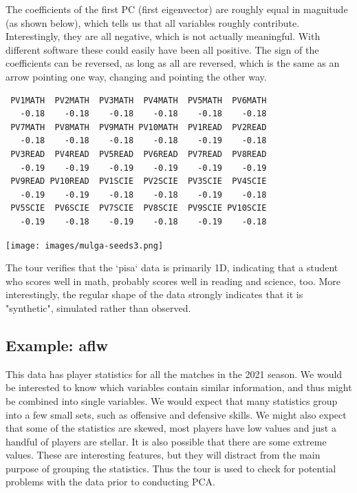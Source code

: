 \documentclass[
  letterpaper,
]{krantz}
\newenvironment{Shaded}{\begin{snugshade}}{\end{snugshade}}
\newcommand{\DecValTok}[1]{\textcolor[rgb]{0.68,0.00,0.00}{#1}}
\newcommand{\FunctionTok}[1]{\textcolor[rgb]{0.28,0.35,0.67}{#1}}
\newcommand{\NormalTok}[1]{\textcolor[rgb]{0.00,0.23,0.31}{#1}}
\newcommand{\SpecialCharTok}[1]{\textcolor[rgb]{0.37,0.37,0.37}{#1}}
\newcommand{\insightbox}[1]{%
\noindent\colorbox{insight!30}{%
\begin{minipage}{0.98\textwidth}%
    \centering%
    \begin{minipage}[c]{0.15\textwidth} %
      \texttt{[image: images/mulga-seeds3.png]} %
    \end{minipage}%
    \hfill %
    \begin{minipage}[c]{0.8\textwidth} %
      \bigskip%
      \textsf{#1}%
      \bigskip%
    \end{minipage}%
    \hspace*{3mm}%
  \end{minipage}%
}%
}
\begin{document}
The coefficients of the first PC (first eigenvector) are roughly equal
in magnitude (as shown below), which tells us that all variables roughly
contribute. Interestingly, they are all negative, which is not actually
meaningful. With different software these could easily have been all
positive. The sign of the coefficients can be reversed, as long as all
are reversed, which is the same as an arrow pointing one way, changing
and pointing the other way.

\begin{Shaded}
\end{Shaded}

\begin{verbatim}
 PV1MATH  PV2MATH  PV3MATH  PV4MATH  PV5MATH  PV6MATH 
   -0.18    -0.18    -0.18    -0.18    -0.18    -0.18 
 PV7MATH  PV8MATH  PV9MATH PV10MATH  PV1READ  PV2READ 
   -0.18    -0.18    -0.18    -0.18    -0.19    -0.18 
 PV3READ  PV4READ  PV5READ  PV6READ  PV7READ  PV8READ 
   -0.19    -0.19    -0.19    -0.19    -0.19    -0.19 
 PV9READ PV10READ  PV1SCIE  PV2SCIE  PV3SCIE  PV4SCIE 
   -0.19    -0.19    -0.18    -0.18    -0.19    -0.18 
 PV5SCIE  PV6SCIE  PV7SCIE  PV8SCIE  PV9SCIE PV10SCIE 
   -0.19    -0.18    -0.19    -0.18    -0.19    -0.18 
\end{verbatim}

\insightbox{The tour verifies that the `pisa` data is primarily 1D, indicating that a student who scores well in math, probably scores well in reading and science, too. More interestingly, the regular shape of the data strongly indicates that it is "synthetic", simulated rather than observed.}

\subsection{Example: aflw}\label{example-aflw}


This data has player statistics for all the matches in the 2021 season.
We would be interested to know which variables contain similar
information, and thus might be combined into single variables. We would
expect that many statistics group into a few small sets, such as
offensive and defensive skills. We might also expect that some of the
statistics are skewed, most players have low values and just a handful
of players are stellar. It is also possible that there are some extreme
values. These are interesting features, but they will distract from the
main purpose of grouping the statistics. Thus the tour is used to check
for potential problems with the data prior to conducting PCA.
\end{document}
